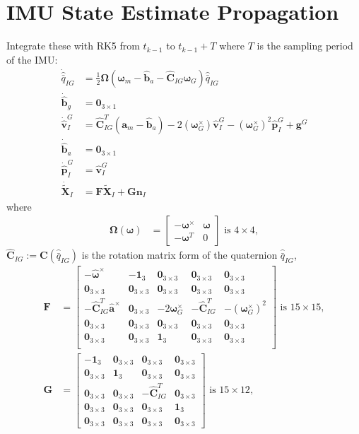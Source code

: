\documentclass[10pt,letterpaper,fleqn,oneside]{article}
\newcommand{\nl}{\\[0.5em]}
\def\Vec#1{\mathbf{#1}} %
\newcommand{\bbm}{\begin{bmatrix}}
\newcommand{\ebm}{\end{bmatrix}}
\begin{document}
\section{IMU State Estimate Propagation}
Integrate these with RK5 from $t_{k-1}$ to $t_{k-1} + T$ where $T$ is the sampling period of the IMU:
\begin{align}
\dot{\hat{\bar{q}}}_{I G} &= \frac{1}{2}\boldsymbol{\Omega}\left(\boldsymbol{\omega}_m - \hat{\Vec{b}}_a - \hat{\Vec{C}}_{I G} \boldsymbol{\omega}_G \right)\hat{\bar{q}}_{I G} \nl
\dot{\hat{\Vec{b}}}_g  &= \Vec{0}_{3\times1} \nl
\dot{\hat{\Vec{v}}}^G_I &= \hat{\Vec{C}}_{I G}^T\left(\Vec{a}_m - \hat{\Vec{b}}_a\right) - 2\left(\boldsymbol{\omega}_G^\times\right)\hat{\Vec{v}}^G_I - \left(\boldsymbol{\omega}_G^\times\right)^2 \left.\hat{\Vec{p}}^G_I\right. + \Vec{g}^G \nl
\dot{\hat{\Vec{b}}}_a &= \Vec{0}_{3\times1} \nl
\dot{\hat{\Vec{p}}}^G_I &= \hat{\Vec{v}}^G_I \nl
\dot{\widetilde{\Vec{X}}}_I &= \Vec{F}\widetilde{\Vec{X}}_I + \Vec{G}\Vec{n}_I
\end{align}
where
\begin{align}
\boldsymbol{\Omega}\left(\boldsymbol{\omega}\right) &= \bbm -\boldsymbol{\omega}^\times & \boldsymbol{\omega} \nl
																										-\boldsymbol{\omega}^T & 0
																								\ebm 
																								\text{ is }4\times4,
\end{align}
$\hat{\Vec{C}}_{I G} := \Vec{C}(\hat{\bar{q}}_{I G})$ is the rotation matrix form of the quaternion $\hat{\bar{q}}_{I G}$,
\begin{align}
\Vec{F} &= \bbm	-\hat{\boldsymbol{\omega}}^\times & -\Vec{1}_3 & \Vec{0}_{3\times3} & \Vec{0}_{3\times3} & \Vec{0}_{3\times3} \nl
					\Vec{0}_{3\times3} & \Vec{0}_{3\times3} & \Vec{0}_{3\times3} & \Vec{0}_{3\times3} & \Vec{0}_{3\times3} \nl
					-\hat{\Vec{C}}_{I G}^T\hat{\Vec{a}}^\times & \Vec{0}_{3\times3} & -2\boldsymbol{\omega}_G^\times & -\hat{\Vec{C}}_{I G}^T & -\left(\boldsymbol{\omega}_G^\times\right)^2 \nl
					\Vec{0}_{3\times3} & \Vec{0}_{3\times3} & \Vec{0}_{3\times3} & \Vec{0}_{3\times3} & \Vec{0}_{3\times3} \nl
					\Vec{0}_{3\times3} & \Vec{0}_{3\times3} & \Vec{1}_3 & \Vec{0}_{3\times3} & \Vec{0}_{3\times3} \nl
		\ebm \text{ is } 15\times15, \nl
\Vec{G} &= 	\bbm	-\Vec{1}_3 & \Vec{0}_{3\times3} & \Vec{0}_{3\times3} & \Vec{0}_{3\times3} \nl
								\Vec{0}_{3\times3} & \Vec{1}_3 & \Vec{0}_{3\times3} & \Vec{0}_{3\times3} \nl
								\Vec{0}_{3\times3} & \Vec{0}_{3\times3} & -\hat{\Vec{C}}_{I G}^T & \Vec{0}_{3\times3} \nl
								\Vec{0}_{3\times3} & \Vec{0}_{3\times3} & \Vec{0}_{3\times3} & \Vec{1}_3 \nl
								\Vec{0}_{3\times3} & \Vec{0}_{3\times3} & \Vec{0}_{3\times3} & \Vec{0}_{3\times3}
					\ebm \text{ is } 15\times12,
\end{align}
\end{document}
